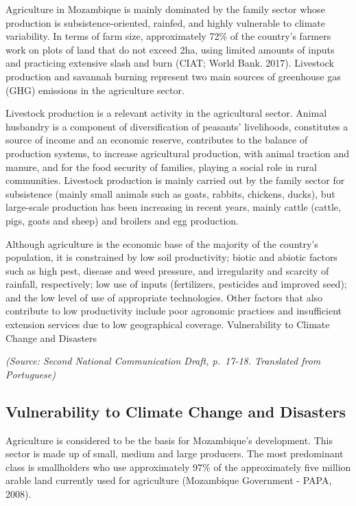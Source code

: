 \documentclass[
]{book}
\begin{document}
Agriculture in Mozambique is mainly dominated by the family sector whose production is subsistence-oriented, rainfed, and highly vulnerable to climate variability. In terms of farm size, approximately 72\% of the country's farmers work on plots of land that do not exceed 2ha, using limited amounts of inputs and practicing extensive slash and burn (CIAT; World Bank. 2017). Livestock production and savannah burning represent two main sources of greenhouse gas (GHG) emissions in the agriculture sector.

Livestock production is a relevant activity in the agricultural sector. Animal husbandry is a component of diversification of peasants' livelihoods, constitutes a source of income and an economic reserve, contributes to the balance of production systems, to increase agricultural production, with animal traction and manure, and for the food security of families, playing a social role in rural communities. Livestock production is mainly carried out by the family sector for subsistence (mainly small animals such as goats, rabbits, chickens, ducks), but large-scale production has been increasing in recent years, mainly cattle (cattle, pigs, goats and sheep) and broilers and egg production.

Although agriculture is the economic base of the majority of the country's population, it is constrained by low soil productivity; biotic and abiotic factors such as high pest, disease and weed pressure, and irregularity and scarcity of rainfall, respectively; low use of inputs (fertilizers, pesticides and improved seed); and the low level of use of appropriate technologies. Other factors that also contribute to low productivity include poor agronomic practices and insufficient extension services due to low geographical coverage.
Vulnerability to Climate Change and Disasters

\emph{(Source: Second National Communication Draft, p.~17-18. Translated from Portuguese)}

\hypertarget{vulnerability-to-climate-change-and-disasters}{%
\subsection{Vulnerability to Climate Change and Disasters}\label{vulnerability-to-climate-change-and-disasters}}

Agriculture is considered to be the basis for Mozambique's development. This sector is made up of small, medium and large producers. The most predominant class is smallholders who use approximately 97\% of the approximately five million arable land currently used for agriculture (Mozambique Government - PAPA, 2008).
\end{document}
